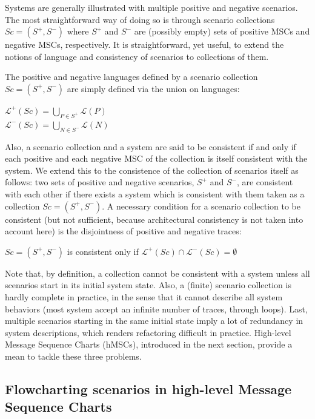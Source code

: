 Systems are generally illustrated with multiple positive and negative scenarios. The most straightforward way of doing so is through scenario collections $Sc = (S^+,S^-)$ where $S^+$ and $S^-$ are (possibly empty) sets of positive MSCs and negative MSCs, respectively. It is straightforward, yet useful, to extend the notions of language and consistency of scenarios to collections of them. 

The positive and negative languages defined by a scenario collection $Sc = (S^+,S^-)$ are simply defined via the union on languages:

\begin{center}
$\mathcal{L}^+(Sc) = \bigcup_{P \in S^+} \mathcal{L}(P)$ \\
$\mathcal{L}^-(Sc) = \bigcup_{N \in S^-} \mathcal{L}(N)$
\end{center}

Also, a scenario collection and a system are said to be consistent if and only if each positive and each negative MSC of the collection is itself consistent with the system. We extend this to the consistence of the collection of scenarios itself as follows: two sets of positive and negative scenarios, $S^+$ and $S^-$, are consistent with each other if there exists a system which is consistent with them taken as a collection $Sc = (S^+,S^-)$. A necessary condition for a scenario collection to be consistent (but not sufficient, because architectural consistency is not taken into account here) is the disjointness of positive and negative traces:

\begin{center}
$Sc = (S^+,S^-)$ is consistent only if $\mathcal{L}^+(Sc) \cap \mathcal{L}^-(Sc) = \emptyset$
\end{center}

Note that, by definition, a collection cannot be consistent with a system unless all scenarios start in its initial system state. Also, a (finite) scenario collection is hardly complete in practice, in the sense that it cannot describe all system behaviors (most system accept an infinite number of traces, through loops). Last, multiple scenarios starting in the same initial state imply a lot of redundancy in system descriptions, which renders refactoring difficult in practice. High-level Message Sequence Charts (hMSCs), introduced in the next section, provide a mean to tackle these three problems.

\subsection[Flowcharting scenarios in high-level MSCs]{Flowcharting scenarios in high-level Message Sequence Charts}

